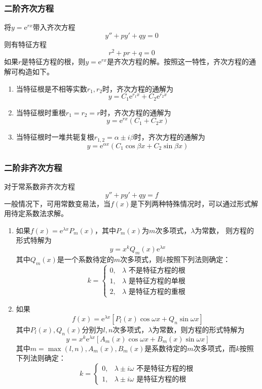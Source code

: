 \subsubsection{二阶齐次方程}
将$y=\mathrm{e}^{rx}$带入齐次方程
\[ y''+py'+qy=0 \]
则有特征方程
\[ r^2 + pr + q = 0 \]
如果$r$是特征方程的根，则$y=\mathrm{e}^{rx}$是齐次方程的解。按照这一特性，齐次方程的通解可构造如下。
\begin{enumerate}[(1)]
    \item 当特征根是不相等实数$r_1,r_2$时，齐次方程的通解为
          \[ y = C_1\mathrm{e}^{r_1x} + C_2\mathrm{e}^{r_2x} \]
    \item 当特征根时重根$r_1=r_2=r$时，齐次方程的通解为
          \[ y= \mathrm{e}^{rx}(C_1 + C_2 x) \]
    \item 当特征根时一堆共轭复根$r_{1,2}=\alpha\pm i\beta$时，齐次方程的通解为
          \[ y = \mathrm{e}^{\alpha x}(C_1\cos\beta x + C_2 \sin\beta x) \]
\end{enumerate}

\subsubsection{二阶非齐次方程}
对于常系数非齐次方程
\[ y'' + py' + qy = f \]
一般情况下，可用常数变易法，当$f(x)$是下列两种特殊情况时，可以通过形式解用待定系数法求解。
\begin{enumerate}[(1)]
    \item 如果$f(x)=\mathrm{e}^{\lambda x}P_m(x)$，其中$P_m(x)$为$m$次多项式，$\lambda$为常数，
          则方程的形式特解为
          \[ y=x^kQ_m(x)\mathrm{e}^{\lambda x} \]
          其中$Q_m(x)$是一个系数待定的$m$次多项式，则$k$按照下列法则确定：
          \[
              k=
              \begin{cases}
                  0, & \lambda\text{ 不是特征方程的根} \\
                  1, & \lambda\text{ 是特征方程的单根} \\
                  2, & \lambda\text{ 是特征方程的重根}
              \end{cases}
          \]
    \item 如果
          \[ f(x) = \mathrm{e}^{\lambda x} [P_l(x)\cos\omega x+ Q_n\sin\omega x]\]
          其中$P_l(x),Q_n(x)$分别为$l,n$次多项式，$\lambda$为常数，则方程的形式特解为
          \[ y=x^k\mathrm{e}^{\lambda x}[A_m(x)\cos\omega x + B_m(x)\sin\omega x] \]
          其中$m=\max(l,n),A_m(x),B_m(x)$是系数待定的$m$次多项式，而$k$按照下列法则确定：
          \[
              k =
              \begin{cases}
                  0, & \lambda\pm i\omega\text{ 不是特征方程的根} \\
                  1, & \lambda\pm i\omega\text{ 是特征方程的根}
              \end{cases}
          \]
\end{enumerate}


